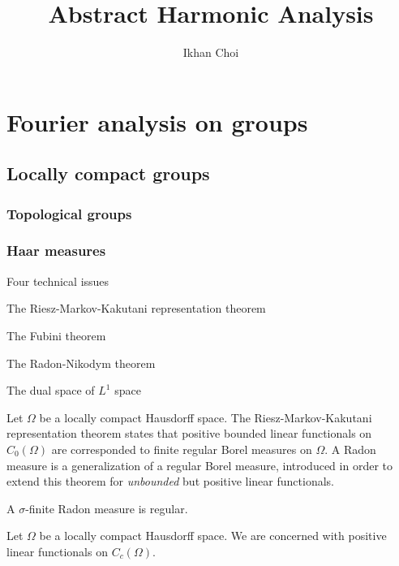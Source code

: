 \documentclass{../note}
\begin{document}
\title{Abstract Harmonic Analysis}
\author{Ikhan Choi}
\maketitle
\tableofcontents



\part{Fourier analysis on groups}
\chapter{Locally compact groups}
\section{Topological groups}
\section{Haar measures}

\begin{prb}
Four technical issues
\begin{parts}
\item The Riesz-Markov-Kakutani representation theorem
\item The Fubini theorem
\item The Radon-Nikodym theorem
\item The dual space of $L^1$ space
\end{parts}
\end{prb}

\begin{prb}
Let $\Omega$ be a locally compact Hausdorff space.
The Riesz-Markov-Kakutani representation theorem states that positive bounded linear functionals on $C_0(\Omega)$ are corresponded to finite regular Borel measures on $\Omega$.
A Radon measure is a generalization of a regular Borel measure, introduced in order to extend this theorem for \emph{unbounded} but positive linear functionals.
\begin{parts}
\item A $\sigma$-finite Radon measure is regular.
\end{parts}
\end{prb}

\begin{prb}
Let $\Omega$ be a locally compact Hausdorff space.
We are concerned with positive linear functionals on $C_c(\Omega)$.
\end{prb}
\end{document}
